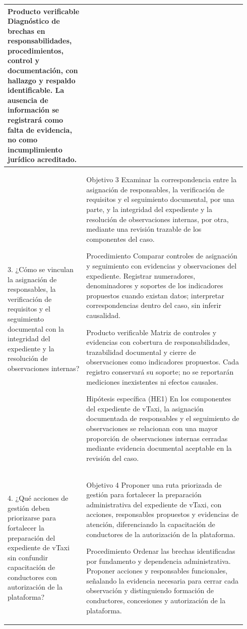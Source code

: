 {\begin{landscape}
\begin{longtable}{@{}p{0.31\linewidth}p{0.63\linewidth}@{}}
Producto verificable
Diagnóstico de brechas en responsabilidades, procedimientos, control y documentación, con hallazgo y respaldo identificable. La ausencia de información se registrará como falta de evidencia, no como incumplimiento jurídico acreditado.\\
\midrule
3. ¿Cómo se vinculan la asignación de responsables, la verificación de requisitos y el seguimiento documental con la integridad del expediente y la resolución de observaciones internas? & Objetivo 3
Examinar la correspondencia entre la asignación de responsables, la verificación de requisitos y el seguimiento documental, por una parte, y la integridad del expediente y la resolución de observaciones internas, por otra, mediante una revisión trazable de los componentes del caso.

Procedimiento
Comparar controles de asignación y seguimiento con evidencias y observaciones del expediente. Registrar numeradores, denominadores y soportes de los indicadores propuestos cuando existan datos; interpretar correspondencias dentro del caso, sin inferir causalidad.

Producto verificable
Matriz de controles y evidencias con cobertura de responsabilidades, trazabilidad documental y cierre de observaciones como indicadores propuestos. Cada registro conservará su soporte; no se reportarán mediciones inexistentes ni efectos causales.\par Hipótesis específica (HE1)
En los componentes del expediente de vTaxi, la asignación documentada de responsables y el seguimiento de observaciones se relacionan con una mayor proporción de observaciones internas cerradas mediante evidencia documental aceptable en la revisión del caso.\\
\midrule
4. ¿Qué acciones de gestión deben priorizarse para fortalecer la preparación del expediente de vTaxi sin confundir capacitación de conductores con autorización de la plataforma? & Objetivo 4
Proponer una ruta priorizada de gestión para fortalecer la preparación administrativa del expediente de vTaxi, con acciones, responsables propuestos y evidencias de atención, diferenciando la capacitación de conductores de la autorización de la plataforma.

Procedimiento
Ordenar las brechas identificadas por fundamento y dependencia administrativa. Proponer acciones y responsables funcionales, señalando la evidencia necesaria para cerrar cada observación y distinguiendo formación de conductores, concesiones y autorización de la plataforma.


\end{longtable}
\end{landscape}}
